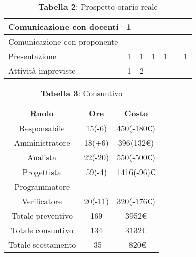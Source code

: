 \begin{table}[H]
\begin{tabular}{|l|r|r|r|r|r|r|}
		Comunicazione con docenti                                                   & 1                                &                                  &                                  &                                  &                                  &                                  \\ \hline
		Comunicazione con proponente                                                &                                  &                                  &                                  &                                  &                                  &                                  \\ \hline
		Presentazione                                                               & 1                                & 1                                & 1                                & 1                                &                                  & 1                                \\ \hline
		Attività impreviste                                                         & 1                                & 2                                & \multicolumn{1}{l|}{}            & \multicolumn{1}{l|}{}            & \multicolumn{1}{l|}{}            & \multicolumn{1}{l|}{}            \\ \hline
	\end{tabular}
	\caption*{\textbf{Tabella 2}: Prospetto orario reale\\}
\end{table}

\begin{table}[H]
	\centering
	\renewcommand{\arraystretch}{1.5}
	\begin{tabular}{|c|c|c|}
		\hline
		\rowcolor{lighter-grayer}
		Ruolo & Ore & Costo \\ \hline
		Responsabile & 15(-6) & 450(-180\euro) \\ \hline
		Amministratore & 18(+6) & 396(132\euro) \\ \hline
		Analista & 22(-20) & 550(-500\euro) \\ \hline
		Progettista & 59(-4) & 1416(-96)\euro \\ \hline
		Programmatore & - & - \\ \hline
		Verificatore & 20(-11) & 320(-176\euro) \\ \hline
		Totale preventivo & 169 & 3952\euro \\ \hline
		Totale consuntivo & 134 & 3132\euro \\ \hline
		Totale scostamento & -35 & -820\euro \\ \hline
	\end{tabular}
	\caption*{\textbf{Tabella 3}: Consuntivo\\}
\end{table}


